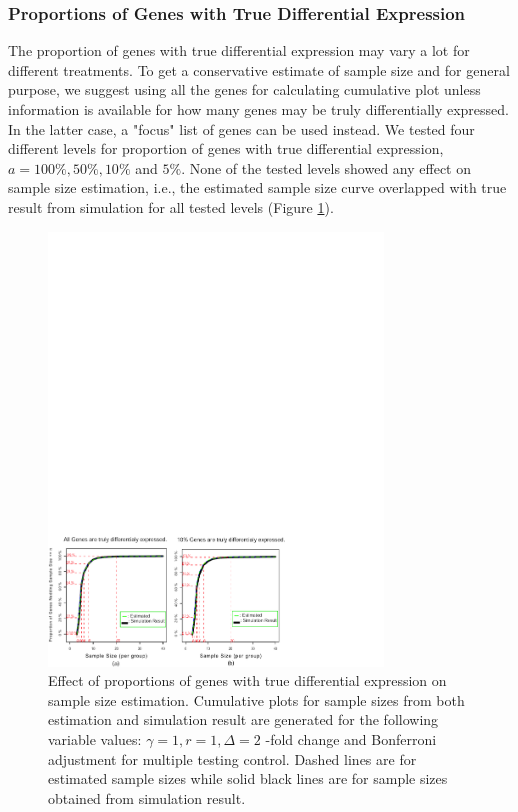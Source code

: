 \documentclass{bioinfo}
\begin{document}
\subsubsection{Proportions of Genes with True Differential Expression}
The proportion of genes with true differential expression may vary
a lot for different treatments. To get a conservative estimate of
sample size and for general purpose, we suggest using all the
genes for calculating cumulative plot unless information is
available for how many genes may be truly differentially
expressed. In the latter case, a "focus" list of genes can be used
instead. We tested four different levels for proportion of genes
with true differential expression, $a = 100\%, 50\%, 10\%$ and
$5\%$. None of the tested levels showed any effect on sample size
estimation, i.e., the estimated sample size curve overlapped with
true result from simulation for all tested levels (Figure
\ref{fig:ResAlt}).

\begin{figure}[h]
  \centerline{\includegraphics*[width=3.5in]{ResAlt.pdf}}
  \caption[Effect of proportions of genes with true differential expression on sample size estimation]
  {Effect of proportions of genes with true differential expression on sample size estimation.
    Cumulative plots for sample sizes from both estimation and simulation result
    are generated for the following variable values: $\gamma = 1, r = 1, \Delta = 2$ -fold change
    and Bonferroni adjustment for multiple testing control. Dashed lines are for estimated sample sizes
    while solid black lines are for sample sizes obtained from simulation result.}
  \label{fig:ResAlt}
\end{figure}
\end{document}
